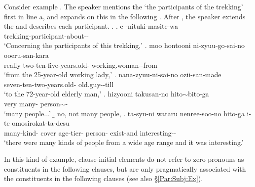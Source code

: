Consider example \Next.
The speaker mentions the  `the participants of the trekking' first in line a,
and expands on this in the following .
After \Next[f],
the speaker extends the  and describes each participant.
%
\ex.\label{trekking}
 \ag. e -nituki-masite-wa \\
 	 trekking-participant-about-- \\
	`Concerning the participants of this trekking,'
 \bg. moo hontooni ni-zyuu-go-sai-no ooeru-san-kara \\
 	 really two-ten-five-years.old- working.woman--from \\
	`from the 25-year-old working lady,'
 \bg. nana-zyuu-ni-sai-no ozii-san-made \\
 	seven-ten-two-years.old- old.guy--till \\
	`to the 72-year-old elderly man,'
 \bg. hizyooni takusan-no hito$\sim$bito-ga \\
 	very many- person$\sim$- \\
	`many people...'
 \b. no, not many people,
 \bg. ta-syu-ni wataru nenree-soo-no hito-ga i-te omosirokat-ta-desu \\
 		many-kind- cover age-tier- person- exist-and interesting-- \\
		`there were many kinds of people from a wide age range and it was interesting.'

In this kind of example,
clause-initial elements do not refer to zero pronouns as constituents in the following clauses,
but are only pragmatically associated with the constituents in the following clauses (see also \S \ref{Par:Subj:Ex}).



